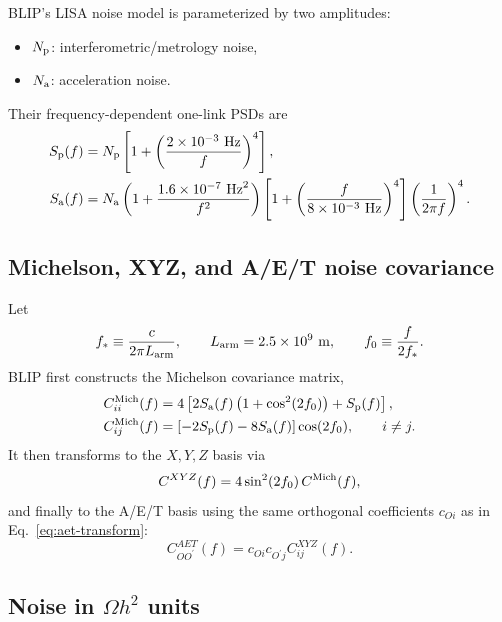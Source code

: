 \documentclass[11pt]{article}
\newcommand{\fstar}{f_\ast}
\newcommand{\Larm}{L_{\rm arm}}
\begin{document}
BLIP's LISA noise model is parameterized by two amplitudes:
\begin{itemize}[leftmargin=2em]
  \item $N_{\rm p}$: interferometric/metrology noise,
  \item $N_{\rm a}$: acceleration noise.
\end{itemize}
Their frequency-dependent one-link PSDs are
\begin{align}
  S_{\rm p}(f)
  &= N_{\rm p}\left[1+\left(\frac{2\times 10^{-3}\ {\rm Hz}}{f}\right)^4\right], \\
  S_{\rm a}(f)
  &= N_{\rm a}
     \left(1+\frac{1.6\times 10^{-7}\ {\rm Hz}^2}{f^2}\right)
     \left[1+\left(\frac{f}{8\times 10^{-3}\ {\rm Hz}}\right)^4\right]
     \left(\frac{1}{2\pi f}\right)^4.
  \label{eq:fundamental-noise}
\end{align}

\subsection{Michelson, XYZ, and A/E/T noise covariance}

Let
\begin{equation}
  \fstar \equiv \frac{c}{2\pi \Larm},
  \qquad
  \Larm = 2.5\times 10^9\ {\rm m},
  \qquad
  f_0 \equiv \frac{f}{2\fstar}.
\end{equation}
BLIP first constructs the Michelson covariance matrix,
\begin{align}
  C^{\rm Mich}_{ii}(f)
  &= 4\left[2S_{\rm a}(f)\left(1+\cos^2(2f_0)\right) + S_{\rm p}(f)\right], \\
  C^{\rm Mich}_{ij}(f)
  &= \left[-2S_{\rm p}(f)-8S_{\rm a}(f)\right]\cos(2f_0),
  \qquad i\neq j.
  \label{eq:mich-noise}
\end{align}
It then transforms to the $X,Y,Z$ basis via
\begin{equation}
  C^{XYZ}(f) = 4\sin^2(2f_0)\,C^{\rm Mich}(f),
\end{equation}
and finally to the A/E/T basis using the same orthogonal coefficients $c_{Oi}$ as in Eq.~\eqref{eq:aet-transform}:
\begin{equation}
  C^{AET}_{OO^\prime}(f) = c_{Oi}c_{O^\prime j} C^{XYZ}_{ij}(f).
  \label{eq:aet-noise-transform}
\end{equation}

\subsection{Noise in $\Omega h^2$ units}
\end{document}
